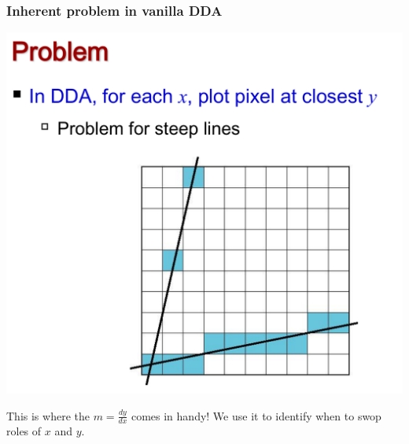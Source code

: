 \documentclass{beamer}
\begin{document}
\begin{frame}
    \frametitle{Inherent problem in vanilla DDA}

    \begin{center}
        \includegraphics[scale=0.3]{dda-problem.png}
    \end{center}

    This is where the $m = \frac{dy}{dx}$ comes in handy! 
    We use it to identify when to swop roles of $x$ and $y$.

\end{frame}
\end{document}
